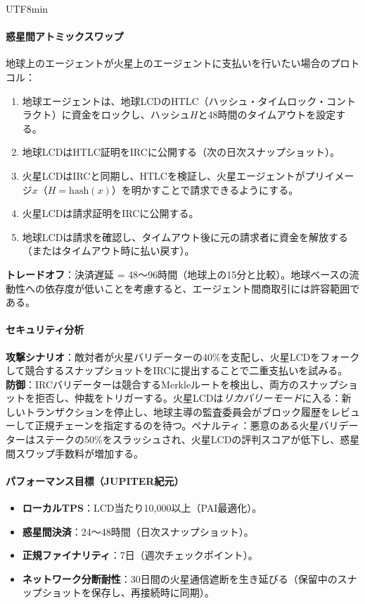 \documentclass[11pt]{article}
\begin{document}
\begin{CJK}{UTF8}{min}
\paragraph{惑星間アトミックスワップ}
地球上のエージェントが火星上のエージェントに支払いを行いたい場合のプロトコル：
\begin{enumerate}[noitemsep]
  \item 地球エージェントは、地球LCDのHTLC（ハッシュ・タイムロック・コントラクト）に資金をロックし、ハッシュ$H$と48時間のタイムアウトを設定する。
  \item 地球LCDはHTLC証明をIRCに公開する（次の日次スナップショット）。
  \item 火星LCDはIRCと同期し、HTLCを検証し、火星エージェントがプリイメージ$x$（$H = \text{hash}(x)$）を明かすことで請求できるようにする。
  \item 火星LCDは請求証明をIRCに公開する。
  \item 地球LCDは請求を確認し、タイムアウト後に元の請求者に資金を解放する（またはタイムアウト時に払い戻す）。
\end{enumerate}
\textbf{トレードオフ}：決済遅延 = 48〜96時間（地球上の15分と比較）。地球ベースの流動性への依存度が低いことを考慮すると、エージェント間商取引には許容範囲である。

\paragraph{セキュリティ分析}
\textbf{攻撃シナリオ}：敵対者が火星バリデーターの40\%を支配し、火星LCDをフォークして競合するスナップショットをIRCに提出することで二重支払いを試みる。\\
\textbf{防御}：IRCバリデーターは競合するMerkleルートを検出し、両方のスナップショットを拒否し、仲裁をトリガーする。火星LCDは\emph{リカバリーモード}に入る：新しいトランザクションを停止し、地球主導の監査委員会がブロック履歴をレビューして正規チェーンを指定するのを待つ。ペナルティ：悪意のある火星バリデーターはステークの50\%をスラッシュされ、火星LCDの評判スコアが低下し、惑星間スワップ手数料が増加する。

\paragraph{パフォーマンス目標（JUPITER紀元）}
\begin{itemize}[noitemsep]
  \item \textbf{ローカルTPS}：LCD当たり10,000以上（PAI最適化）。
  \item \textbf{惑星間決済}：24〜48時間（日次スナップショット）。
  \item \textbf{正規ファイナリティ}：7日（週次チェックポイント）。
  \item \textbf{ネットワーク分断耐性}：30日間の火星通信遮断を生き延びる（保留中のスナップショットを保存し、再接続時に同期）。
\end{itemize}


\end{CJK}
\end{document}
